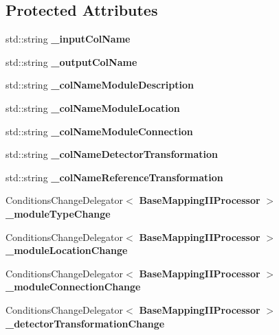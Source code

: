 \subsection*{Protected Attributes}
\begin{DoxyCompactItemize}
\item 
std::string {\bfseries \_\-inputColName}\label{classCALICE_1_1BaseMappingIIProcessor_a89f87c70722b470ce3351a1a94a04c5d}

\item 
std::string {\bfseries \_\-outputColName}\label{classCALICE_1_1BaseMappingIIProcessor_a55c4612d6057c09ccabb5bce43cfd184}

\item 
std::string {\bfseries \_\-colNameModuleDescription}\label{classCALICE_1_1BaseMappingIIProcessor_a3cf654ae79db0b075343f05f66b86974}

\item 
std::string {\bfseries \_\-colNameModuleLocation}\label{classCALICE_1_1BaseMappingIIProcessor_a2ca5ef0fe54cf330a00b5a89fe7baacf}

\item 
std::string {\bfseries \_\-colNameModuleConnection}\label{classCALICE_1_1BaseMappingIIProcessor_a0a03a8f94ec07d56db8cb88174fe72cd}

\item 
std::string {\bfseries \_\-colNameDetectorTransformation}\label{classCALICE_1_1BaseMappingIIProcessor_aed612620eab1d8ebeb5a584826f70781}

\item 
std::string {\bfseries \_\-colNameReferenceTransformation}\label{classCALICE_1_1BaseMappingIIProcessor_a944b28e0d8de4b183e9dced0d24aa863}

\item 
ConditionsChangeDelegator$<$ {\bf BaseMappingIIProcessor} $>$ {\bfseries \_\-moduleTypeChange}\label{classCALICE_1_1BaseMappingIIProcessor_aec48652f1896782024ba9cf85eaeb0f9}

\item 
ConditionsChangeDelegator$<$ {\bf BaseMappingIIProcessor} $>$ {\bfseries \_\-moduleLocationChange}\label{classCALICE_1_1BaseMappingIIProcessor_abbc58227157b9c1c293845f46e41b37a}

\item 
ConditionsChangeDelegator$<$ {\bf BaseMappingIIProcessor} $>$ {\bfseries \_\-moduleConnectionChange}\label{classCALICE_1_1BaseMappingIIProcessor_a862d6f636084c8a5b97a3d325aaf9115}

\item 
ConditionsChangeDelegator$<$ {\bf BaseMappingIIProcessor} $>$ {\bfseries \_\-detectorTransformationChange}\label{classCALICE_1_1BaseMappingIIProcessor_abd2368662503bb079b2e60e10c5ff77f}


\end{DoxyCompactItemize}

